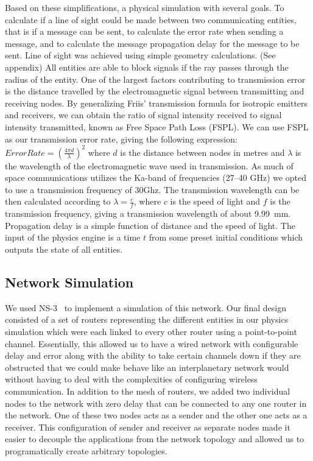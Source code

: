 \documentclass[a4paper,12pt]{article}
\begin{document}
Based on these simplifications, a physical simulation with several goals. To
calculate if a line of sight could be made between two communicating entities,
that is if a message can be sent, to calculate the error rate when sending a
message, and to calculate the message propagation delay for the message to be
sent. Line of sight was achieved using simple geometry calculations. (See
appendix) All entities are able to block signals if the ray passes through the
radius of the entity. One of the largest factors contributing to transmission
error is the distance travelled by the electromagnetic signal between
transmitting and receiving nodes. By generalizing Friis' transmission formula
for isotropic emitters and receivers, we can obtain the ratio of signal
intensity received to signal intensity transmitted, known as Free Space Path
Loss (FSPL). We can use FSPL as our transmission error rate, giving the
following expression: $Error Rate = {(\frac{4 \pi d}{\lambda})}^2$ where $d$ is
the distance between nodes in metres and $\lambda$ is the wavelength of the
electromagnetic wave used in transmission. As much of space communications
utilizes the Ka-band of frequencies (27--40 GHz) we opted to use a transmission
frequency of 30Ghz. The transmission wavelength can be then calculated according
to $\lambda = \frac{c}{f}$, where $c$ is the speed of light and $f$ is the
transmission frequency, giving a transmission wavelength of about 9.99~mm.
Propagation delay is a simple function of distance and the speed of light. The
input of the physics engine is a time $t$ from some preset initial conditions
which outputs the state of all entities.

\subsection{Network Simulation}

We used NS-3~\cite{ns-3} to implement a simulation of this network. Our final design
consisted of a set of routers representing the different entities in our physics
simulation which were each linked to every other router using a point-to-point
channel. Essentially, this allowed us to have a wired network with configurable
delay and error along with the ability to take certain channels down if they are
obstructed that we could make behave like an interplanetary network would
without having to deal with the complexities of configuring wireless
communication. In addition to the mesh of routers, we added two individual nodes
to the network with zero delay that can be connected to any one router in the
network. One of these two nodes acts as a sender and the other one acts as a
receiver. This configuration of sender and receiver as separate nodes made it
easier to decouple the applications from the network topology and allowed us to
programatically create arbitrary topologies.
\end{document}
